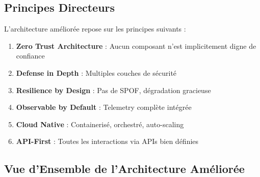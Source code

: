 \documentclass[12pt,a4paper]{article}
\begin{document}
\subsection{Principes Directeurs}

L'architecture améliorée repose sur les principes suivants :

\begin{enumerate}[leftmargin=2cm]
    \item \textbf{Zero Trust Architecture} : Aucun composant n'est implicitement digne de confiance
    \item \textbf{Defense in Depth} : Multiples couches de sécurité
    \item \textbf{Resilience by Design} : Pas de SPOF, dégradation gracieuse
    \item \textbf{Observable by Default} : Telemetry complète intégrée
    \item \textbf{Cloud Native} : Containerisé, orchestré, auto-scaling
    \item \textbf{API-First} : Toutes les interactions via APIs bien définies
\end{enumerate}

\subsection{Vue d'Ensemble de l'Architecture Améliorée}
\end{document}
